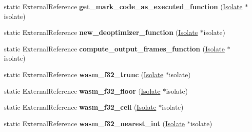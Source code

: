 \begin{DoxyCompactItemize}
\item 
static External\+Reference {\bfseries get\+\_\+mark\+\_\+code\+\_\+as\+\_\+executed\+\_\+function} (\hyperlink{classv8_1_1internal_1_1_isolate}{Isolate} $\ast$isolate)\hypertarget{classv8_1_1internal_1_1_b_a_s_e___e_m_b_e_d_d_e_d_a29a371a8bb969b25b90c419388717daf}{}\label{classv8_1_1internal_1_1_b_a_s_e___e_m_b_e_d_d_e_d_a29a371a8bb969b25b90c419388717daf}

\item 
static External\+Reference {\bfseries new\+\_\+deoptimizer\+\_\+function} (\hyperlink{classv8_1_1internal_1_1_isolate}{Isolate} $\ast$isolate)\hypertarget{classv8_1_1internal_1_1_b_a_s_e___e_m_b_e_d_d_e_d_af375fbffafe332f97576597b172eacf8}{}\label{classv8_1_1internal_1_1_b_a_s_e___e_m_b_e_d_d_e_d_af375fbffafe332f97576597b172eacf8}

\item 
static External\+Reference {\bfseries compute\+\_\+output\+\_\+frames\+\_\+function} (\hyperlink{classv8_1_1internal_1_1_isolate}{Isolate} $\ast$isolate)\hypertarget{classv8_1_1internal_1_1_b_a_s_e___e_m_b_e_d_d_e_d_a6ff7b580fb4309d04ff806abc224384c}{}\label{classv8_1_1internal_1_1_b_a_s_e___e_m_b_e_d_d_e_d_a6ff7b580fb4309d04ff806abc224384c}

\item 
static External\+Reference {\bfseries wasm\+\_\+f32\+\_\+trunc} (\hyperlink{classv8_1_1internal_1_1_isolate}{Isolate} $\ast$isolate)\hypertarget{classv8_1_1internal_1_1_b_a_s_e___e_m_b_e_d_d_e_d_a4fa32f0d5e9897e50ddf68a62e9672e6}{}\label{classv8_1_1internal_1_1_b_a_s_e___e_m_b_e_d_d_e_d_a4fa32f0d5e9897e50ddf68a62e9672e6}

\item 
static External\+Reference {\bfseries wasm\+\_\+f32\+\_\+floor} (\hyperlink{classv8_1_1internal_1_1_isolate}{Isolate} $\ast$isolate)\hypertarget{classv8_1_1internal_1_1_b_a_s_e___e_m_b_e_d_d_e_d_ace50dc8ad332aee879964ee7dd9073f7}{}\label{classv8_1_1internal_1_1_b_a_s_e___e_m_b_e_d_d_e_d_ace50dc8ad332aee879964ee7dd9073f7}

\item 
static External\+Reference {\bfseries wasm\+\_\+f32\+\_\+ceil} (\hyperlink{classv8_1_1internal_1_1_isolate}{Isolate} $\ast$isolate)\hypertarget{classv8_1_1internal_1_1_b_a_s_e___e_m_b_e_d_d_e_d_a65d4e59ba625ccc3fe80f794857478cd}{}\label{classv8_1_1internal_1_1_b_a_s_e___e_m_b_e_d_d_e_d_a65d4e59ba625ccc3fe80f794857478cd}

\item 
static External\+Reference {\bfseries wasm\+\_\+f32\+\_\+nearest\+\_\+int} (\hyperlink{classv8_1_1internal_1_1_isolate}{Isolate} $\ast$isolate)\hypertarget{classv8_1_1internal_1_1_b_a_s_e___e_m_b_e_d_d_e_d_a480fcadb3e7a983b2443b32f8e852ddc}{}\label{classv8_1_1internal_1_1_b_a_s_e___e_m_b_e_d_d_e_d_a480fcadb3e7a983b2443b32f8e852ddc}


\end{DoxyCompactItemize}
